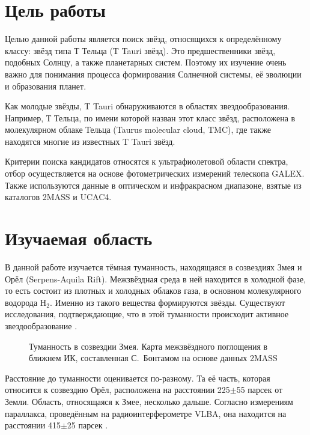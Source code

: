 

\section{Цель работы}
Целью данной работы является поиск звёзд, относящихся к определённому классу: звёзд типа Т Тельца (T Tauri звёзд).
Это предшественники звёзд, подобных Солнцу, а также планетарных систем. Поэтому их изучение очень важно для понимания процесса формирования Солнечной системы, её эволюции и образования планет. 

Как молодые звёзды, T Tauri обнаруживаются в областях звездообразования. Например, Т Тельца, по имени которой назван этот класс звёзд, расположена в молекулярном облаке Тельца (Taurus molecular cloud, TMC), где также находятся многие из известных T Tauri звёзд.

Критерии поиска кандидатов относятся к ультрафиолетовой области спектра, отбор осуществляется на основе фотометрических измерений телескопа GALEX. Также используются данные в оптическом и инфракрасном диапазоне, взятые из каталогов 2MASS и UCAC4.

\section{Изучаемая область}

В данной работе изучается тёмная туманность, находящаяся в созвездиях Змея и Орёл (Serpens-Aquila Rift). Межзвёздная среда в ней находится в холодной фазе, то есть состоит из плотных и холодных облаков газа, в основном молекулярного водорода H$_{2}$. Именно из такого вещества формируются звёзды. Существуют исследования, подтверждающие, что в этой туманности происходит активное звездообразование \cite{park2012far}.

\begin{figure}[ht]
\hfill
\caption{Туманность в созвездии Змея. Карта межзвёздного поглощения в ближнем ИК, составленная С.~Бонтамом на основе данных 2MASS \cite{andreprobing}}
\label{fig:area}
\end{figure}


Расстояние до туманности оценивается по-разному. Та её часть, которая относится к созвездию Орёл, расположена на расстоянии 225$\pm$55 парсек от Земли. Область, относящаяся к Змее, несколько дальше. Согласно измерениям параллакса, проведённым на радиоинтерферометре VLBA, она находится на расстоянии 415$\pm$25 парсек \cite{park2012far}.


